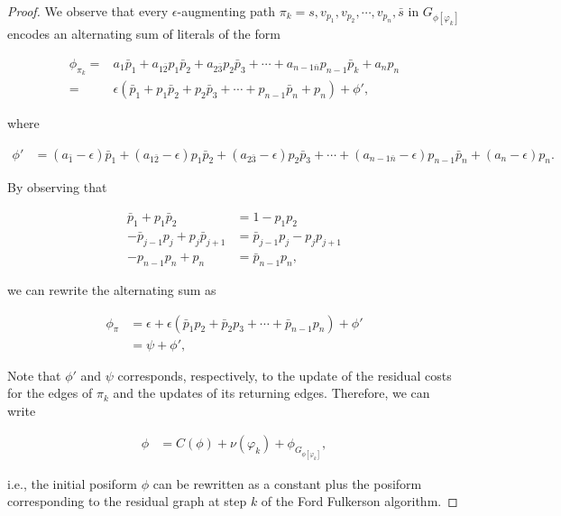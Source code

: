 \begin{proof}

We observe that every $\epsilon$-augmenting path $\pi_k = s,v_{p_1},v_{p_2},\cdots,v_{p_n},\bar{s}$ in $G_{\phi [\varphi_k]}$ encodes an alternating sum of literals of the form

\begin{align*}
	\phi_{\pi_k} =& a_1\bar{p}_1 + a_{1\bar{2}}p_1\bar{p}_2 + a_{2\bar{3}}p_2\bar{p}_3 + \cdots + a_{n-1\bar{n}}p_{n-1}\bar{p}_k + a_np_n \\
	=&\epsilon( \bar{p}_1 + p_1\bar{p}_2 + p_2\bar{p}_3 + \cdots + p_{n-1}\bar{p}_n + p_n ) + \phi ',
\end{align*}

where

\begin{align*}
	\phi ' &= (a_{\bar{1}}-\epsilon)\bar{p}_1 + (a_{1\bar{2}} - \epsilon) p_1\bar{p}_2 + (a_{2\bar{3}}  - \epsilon)p_2\bar{p}_3 + \cdots + (a_{n-1\bar{n}} - \epsilon)p_{n-1}\bar{p}_n + (a_n -\epsilon)p_n.
\end{align*}

By observing that

\begin{align*}
	\bar{p}_1 + p_1\bar{p}_2 &= 1 - p_1p_2 \\
	-\bar{p}_{j-1}p_{j} + p_j\bar{p}_{j+1} &= \bar{p}_{j-1}p_j - p_jp_{j+1} \\
	-p_{n-1}p_n + p_n &= \bar{p}_{n-1}p_n,
\end{align*}

we can rewrite the alternating sum as

\begin{align*}
	\phi_{\pi} &= \epsilon + \epsilon( \bar{p}_1p_2 + \bar{p}_2p_3 + \cdots + \bar{p}_{n-1}p_n ) + \phi ' \\
	&= \psi + \phi ',	
\end{align*}

Note that $\phi '$ and $\psi$ corresponds, respectively, to the update of the residual costs for the edges of $\pi_k$ and the updates of its returning edges. Therefore, we can write


\begin{align*}
	\phi &= C(\phi) + \nu(\varphi_k) + \phi_{ G_{ \phi [\varphi_k] }},
\end{align*}

i.e., the initial posiform $\phi$ can be rewritten as a constant plus the posiform corresponding to the residual graph at step $k$ of  the Ford Fulkerson algorithm. 
\end{proof}

